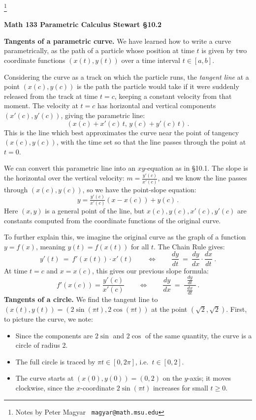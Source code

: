 \documentclass[11pt]{article}
\begin{document}
\footnote[0]{Notes by Peter Magyar \ {\tt magyar@math.msu.edu}}
\vspace{-1em}

\centerline{\bf Math 133\hspace{1.5em} \hfill{\Large\bf
Parametric Calculus}\hfill 
Stewart \S10.2}
\vspace{1em}

\noindent 
{\bf Tangents of a parametric curve.} We have learned how to write a curve parametrically, as the path of a particle whose position at time $t$ is
given by two coordinate functions $(x(t),y(t))$ over a time interval $t\in[a,b]$.

Considering the curve as a track on which the particle runs,
the {\it tangent line} at a point $(x(c),y(c))$ 
is the path the particle would take if
it were suddenly released from the track at time $t=c$, 
keeping a constant velocity from that moment.
The velocity at $t=c$ has horizontal and vertical components
$(x'(c), y'(c))$, giving the parametric line:
$$
(x(c)+x'(c)\,t, \, y(c) +y'(c)\,t)\,.
$$
This is the line which best approximates the curve near the point of tangency $(x(c),y(c))$, with the time set so that the line passes through the point at $t=0$.

We can convert this parametric line into an $xy$-equation as in \S10.1.
The slope is the horizontal over the vertical velocity: $m=\frac{y'(c)}{x'(c)}$, and we know the line passes through $(x(c),y(c))$, so we have 
the point-slope equation:
$$
y = \tfrac{y'(c)}{x'(c)}(x{-}x(c))+ y(c)\,.
$$
Here $(x,y)$ is a general point of the line, 
but $x(c),y(c), x'(c),y'(c)$ are constants 
computed from the coordinate functions of the original curve.

To further explain this, 
we imagine the original curve as the graph of a function
$y=f(x)$, meaning $y(t)=f(x(t))$ for all $t$. 
The Chain Rule gives:
$$
y'(t)  \ =\ f'(x(t))\cdot x'(t) 
\qquad\Longleftrightarrow\qquad
\frac{dy}{dt} \ =\ \frac{dy}{dx}\cdot\frac{dx}{dt}\ .
$$
At time $t=c$ and $x=x(c)$, this gives our previous slope formula:
$$
f'(x(c))=\frac{y'(c)}{x'(c)}
\qquad\Longleftrightarrow\qquad
\frac{dy}{dx}  \ =\ 
\frac {\ \ \frac{dy}{dt}\ \ } {\frac{dx}{dt}}\,.
 $$ 
{\bf Tangents of a circle.} We find the tangent line to 
$(x(t),y(t)) = (2\sin(\pi t),2\cos(\pi t))$ at the point $(\sqrt 2,\sqrt 2)$.
First, to picture the curve, we note:
\begin{itemize}
\item Since the components are $2\sin$ and $2\cos$ of the 
same quantity, the curve is a circle of radius 2.
\item The full circle is traced by $\pi t\in[0,2\pi]$, i.e.~$t\in[0,2]$.
\item The curve starts at $(x(0), y(0)) = (0,2)$
on the $y$-axis; it moves clockwise, since the $x$-coordinate
$2\sin(\pi t)$ increases for small $t\geq0$.

\end{itemize}
\end{document}
